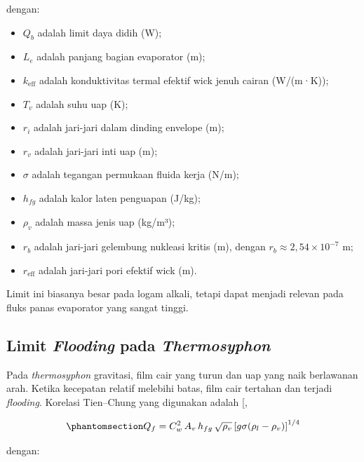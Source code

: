 \documentclass[
  indonesian,
  12pt,
  a4paper,
]{report}
\providecommand{\tightlist}{%
  \setlength{\itemsep}{0pt}\setlength{\parskip}{0pt}}
\begin{document}
dengan:

\begin{itemize}
\tightlist
\item
  \(Q_b\) adalah limit daya didih (W);
\item
  \(L_e\) adalah panjang bagian evaporator (m);
\item
  \(k_{\mathrm{eff}}\) adalah konduktivitas termal efektif wick jenuh
  cairan (W/(m·K));
\item
  \(T_v\) adalah suhu uap (K);
\item
  \(r_i\) adalah jari-jari dalam dinding envelope (m);
\item
  \(r_v\) adalah jari-jari inti uap (m);
\item
  \(\sigma\) adalah tegangan permukaan fluida kerja (N/m);
\item
  \(h_{fg}\) adalah kalor laten penguapan (J/kg);
\item
  \(\rho_v\) adalah massa jenis uap (kg/m³);
\item
  \(r_b\) adalah jari-jari gelembung nukleasi kritis (m), dengan
  \(r_b \approx 2{,}54\times10^{-7}\) m;
\item
  \(r_{\mathrm{eff}}\) adalah jari-jari pori efektif wick (m).
\end{itemize}

Limit ini biasanya besar pada logam alkali, tetapi dapat menjadi relevan
pada fluks panas evaporator yang sangat tinggi.

\subsection{\texorpdfstring{Limit \emph{Flooding} pada
\emph{Thermosyphon}}{Limit Flooding pada Thermosyphon}}\label{limit-flooding-pada-thermosyphon}

Pada \emph{thermosyphon} gravitasi, film cair yang turun dan uap yang
naik berlawanan arah. Ketika kecepatan relatif melebihi batas, film cair
tertahan dan terjadi \emph{flooding}. Korelasi Tien--Chung yang
digunakan adalah {[},
\citeproc{ref-tien1979}{14}{]}

\begin{equation}\protect\phantomsection\label{eq-flooding}{ Q_f = C_w^2\,A_v\,h_{fg}\,\sqrt{\rho_v}
   \left[g\sigma(\rho_l-\rho_v)\right]^{1/4} }\end{equation}

dengan:
\end{document}
